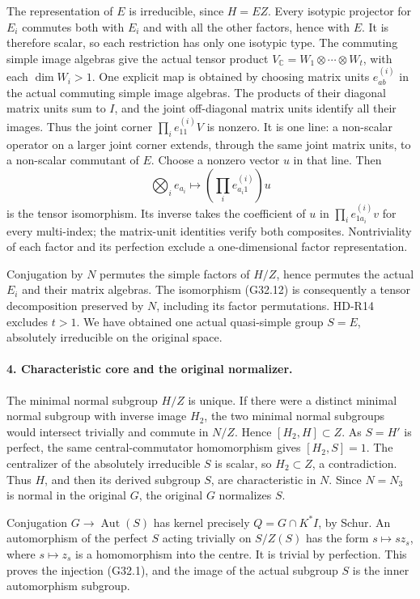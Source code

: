The representation of \(E\) is irreducible, since \(H=EZ\).
Every isotypic projector for \(E_i\) commutes both with \(E_i\)
and with all the other factors, hence with \(E\). It is therefore
scalar, so each restriction has only one isotypic type.
The commuting simple image algebras give the actual tensor product
\(V_{\mathbb C}=W_1\otimes\cdots\otimes W_t\), with each
\(\dim W_i>1\). One explicit map is obtained by choosing matrix
units \(e^{(i)}_{ab}\) in the actual commuting simple image
algebras. The products of their diagonal matrix units sum to
\(I\), and the joint off-diagonal matrix units identify all
their images. Thus the joint corner
\(\prod_i e^{(i)}_{11}V\) is nonzero. It is one line: a
non-scalar operator on a larger joint corner extends, through
the same joint matrix units, to a non-scalar commutant of
\(E\). Choose a nonzero vector \(u\) in that line.
Then
\[
 \bigotimes_i e_{a_i}\longmapsto
              \left(\prod_i e^{(i)}_{a_i1}\right)u
 \tag{G32.12}
\]
is the tensor isomorphism. Its inverse takes the coefficient
of \(u\) in \(\prod_i e^{(i)}_{1a_i}v\) for every multi-index;
the matrix-unit identities verify both composites. Nontriviality
of each factor and its perfection exclude a one-dimensional
factor representation.

Conjugation by \(N\) permutes the simple factors of \(H/Z\),
hence permutes the actual \(E_i\) and their matrix algebras.
The isomorphism (G32.12) is consequently a tensor decomposition
preserved by \(N\), including its factor permutations. HD-R14
excludes \(t>1\). We have obtained one actual quasi-simple group
\(S=E\), absolutely irreducible on the original space.

\paragraph{4. Characteristic core and the original normalizer.}
The minimal normal subgroup \(H/Z\) is unique. If there were a
distinct minimal normal subgroup with inverse image \(H_2\),
the two minimal normal subgroups would intersect trivially and
commute in \(N/Z\). Hence \([H_2,H]\subset Z\). As \(S=H'\)
is perfect, the same central-commutator homomorphism gives
\([H_2,S]=1\). The centralizer of the absolutely irreducible
\(S\) is scalar, so \(H_2\subset Z\), a contradiction.
Thus \(H\), and then its derived subgroup \(S\), are
characteristic in \(N\). Since \(N=N_3\) is normal in the original
\(G\), the original \(G\) normalizes \(S\).

Conjugation \(G\to\operatorname{Aut}(S)\) has kernel precisely
\(Q=G\cap K^*I\), by Schur. An automorphism of the perfect \(S\)
acting trivially on \(S/Z(S)\) has the form
\(s\mapsto s z_s\), where \(s\mapsto z_s\) is a homomorphism
into the centre. It is trivial by perfection. This proves the
injection (G32.1), and the image of the actual subgroup \(S\)
is the inner automorphism subgroup.

